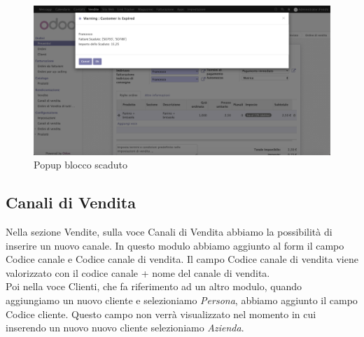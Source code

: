 \vspace*{1.5cm}
\begin{figure}[H]
	\begin{center} \includegraphics[scale=0.3]{figures/check_expired}
		\caption[Popup blocco scaduto]{Popup blocco scaduto}
		\label{fig:check_expired}
	\end{center}
\end{figure}


\newpage
\subsection{Canali di Vendita}
Nella sezione Vendite, sulla voce Canali di Vendita abbiamo la possibilità di inserire un nuovo canale.
In questo modulo abbiamo aggiunto al form il campo Codice canale e Codice canale di vendita.
Il campo Codice canale di vendita viene valorizzato con il codice canale + nome del canale di vendita.\\
Poi nella voce Clienti, che fa riferimento ad un altro modulo, quando aggiungiamo un nuovo cliente e selezioniamo \textit{Persona}, abbiamo aggiunto il campo Codice cliente. Questo campo non verrà visualizzato nel momento in cui inserendo un nuovo nuovo cliente selezioniamo \textit{Azienda}.


